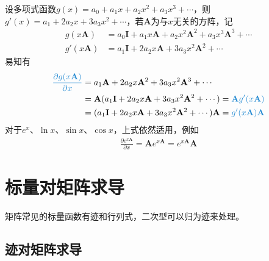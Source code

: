 \documentclass{ctexart}
\newcommand{\blue}[1]{\textcolor{Solarized-blue}{#1}}
\theoremstyle{definition}
\def \Av {\mathbf{A}}
\def \Iv {\mathbf{I}}
\begin{document}
设多项式函数$g(x) = a_0 + a_1 x + a_2 x^2 + a_3 x^3 + \cdots$，则$g'(x) = a_1 + 2 a_2 x + 3 a_3 x^2 + \cdots$，若$\Av$为与$x$无关的方阵，记
\begin{align*}
    g (x \Av)  & = a_0 \Iv + a_1 x \Av + a_2 x^2 \Av^2 + a_3 x^3 \Av^3 + \cdots \\
    g' (x \Av) & = a_1 \Iv + 2 a_2 x \Av + 3 a_3 x^2 \Av^2 + \cdots
\end{align*}
易知有
\begin{align*}
    \blue{\frac{\partial g(x \Av)}{\partial x}} & = a_1 \Av + 2 a_2 x \Av^2 + 3 a_3 x^2 \Av^3 + \cdots                             \\
                                                & = \Av (a_1 \Iv + 2 a_2 x \Av + 3 a_3 x^2 \Av^2 + \cdots) = \blue{\Av g' (x \Av)} \\
                                                & = (a_1 \Iv + 2 a_2 x \Av + 3 a_3 x^2 \Av^2 + \cdots) \Av = \blue{g' (x \Av) \Av}
\end{align*}
对于$e^x$、$\ln x$、$\sin x$、$\cos x$，上式依然适用，例如
\begin{align*}
    \frac{\partial e^{x \Av}}{\partial x} = \Av e^{x \Av} = e^{x \Av} \Av
\end{align*}

\section{标量对矩阵求导}

矩阵常见的标量函数有\blue{迹}和\blue{行列式}，二次型可以归为迹来处理。

\subsection{迹对矩阵求导}
\end{document}
